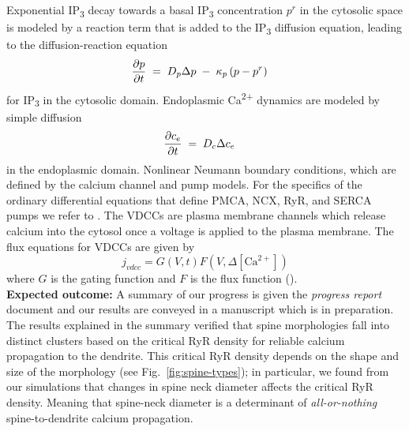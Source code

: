 \noindent Exponential IP\textsubscript{3} decay towards a basal IP\textsubscript{3} concentration
$p^r$ in the cytosolic space is modeled by a reaction term that is added to the
IP\textsubscript{3} diffusion equation, leading to the diffusion-reaction equation
\begin{align}
  \delT{\ip3} & \;=\; D_p\Delta\ip3 \;-\; \kappa_{\ip3}\left(\ip3-{\ip3}^{r}\right)
\end{align}
for IP\textsubscript{3} in the cytosolic domain.
Endoplasmic Ca\textsuperscript{2+} dynamics are modeled by simple diffusion
\begin{align}
  \delT{\cer} & \;=\; D_{c}\Delta\cer
\end{align}
in the endoplasmic domain. Nonlinear Neumann boundary conditions, which are defined by the calcium channel and pump models. 
For the specifics of the ordinary differential equations that define PMCA, NCX, RyR, and SERCA pumps we refer to \cite{Breit2018b}. {The VDCCs are plasma membrane channels which release calcium into the cytosol once a voltage is applied to the plasma membrane. The flux equations for VDCCs are given by
\begin{equation}
	j_{vdcc}=G(V,t)F(V,\Delta [\textrm{Ca}^{2+}])
\end{equation}
where $G$ is the gating function and $F$ is the flux function (\cite{BorgGraham}). 
} \\
\textbf{Expected outcome:} 
{A summary of our progress is given the \textit{progress report} document and our results are conveyed in a manuscript which is in preparation.
The results explained in the summary verified that spine morphologies fall into distinct clusters based on the critical RyR density for reliable calcium propagation to the dendrite. This critical RyR density depends on the shape and size of the morphology (see Fig.~\ref{fig:spine-types}); in particular, we found from our simulations that changes in spine neck diameter affects the critical RyR density. Meaning that spine-neck diameter is a determinant of \textit{all-or-nothing} spine-to-dendrite calcium propagation.}
